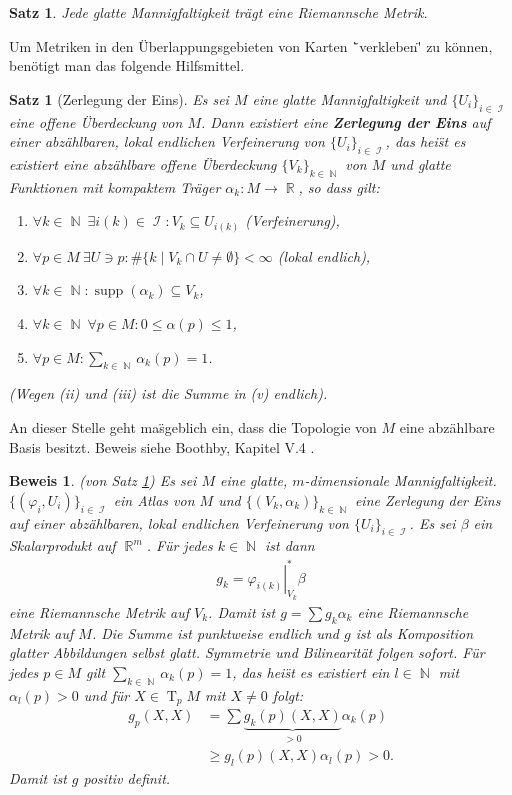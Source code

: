 \documentclass[paper=A4, twoside, chapterprefix=true, bibliography=totoc, headsepline]{scrbook}
\let\temp\phi{}
\let\phi\varphi{}
\let\varphi\temp{}
\let\temp\theta{}
\let\theta\vartheta{}
\let\vartheta\temp{}
\let\temp\epsilon{}
\let\epsilon\varepsilon{}
\let\varepsilon\temp{}
\let\temp\rho{}
\let\rho\varrho{}
\let\varrho\temp{}
\DeclareMathOperator{\N}{\mathbb{N}}
\DeclareMathOperator{\R}{\mathbb{R}}
\DeclareMathOperator{\calI}{\mathcal{I}}
\DeclareMathOperator{\supp}{supp}   %
\DeclareMathOperator{\T}{T}         %
\theoremstyle{plain}
\newtheorem{Satz}[Dfn]{Satz}
\theoremstyle{nonumberplain}
\newtheorem{satz}{Satz}
\newtheorem{bew}{Beweis}
\theoremstyle{empty}
\theoremstyle{break}
\newcommand{\CmIndex}[2][]{\ifthenelse{\isempty{#1}}{\index{#2}}{\index{#1}}#2}
\newcommand{\CmMark}[2][]{\textbf{\CmIndex[#1]{#2}}}
\begin{document}
\begin{Satz}\label{Satz-6-3}
  Jede glatte Mannigfaltigkeit tr\"agt eine Riemannsche Metrik.
\end{Satz}

Um Metriken in den \"Uberlappungsgebieten von Karten \"`verkleben\"' zu k\"onnen, ben\"otigt man das folgende Hilfsmittel.

\begin{satz}[Zerlegung der Eins]
  Es sei $M$ eine glatte Mannigfaltigkeit und $\{U_i\}_{i \in \calI}$ eine offene \"Uberdeckung von $M$.
  Dann existiert eine \CmMark{Zerlegung der Eins} auf einer abz\"ahlbaren, lokal endlichen Verfeinerung von $\{U_i\}_{i \in \calI}$, das hei\"st es existiert eine abz\"ahlbare offene \"Uberdeckung $\{V_k\}_{k\in\N}$ von $M$ und glatte Funktionen mit kompaktem Tr\"ager $\alpha_k \colon M \to \R$, so dass gilt:

  \begin{enumerate}[label=(\roman*)]
  \item $\forall k \in \N \ \exists i(k) \in \calI: V_k \subseteq U_{i(k)}$ (Verfeinerung),
  \item $\forall p \in M \ \exists U \ni p: \# \{k \mid V_k \cap U \neq \emptyset \} < \infty$ (lokal endlich),
  \item $\forall k \in \N: \supp (\alpha_k) \subseteq V_k$,
  \item $\forall k \in \N \ \forall p \in M: 0 \leq \alpha(p) \leq 1$,
  \item $\forall p \in M: \sum_{k\in\N}\alpha_k(p) = 1$.
  \end{enumerate}
  (Wegen (ii) und (iii) ist die Summe in (v) endlich).
\end{satz}
An dieser Stelle geht ma\"sgeblich ein, dass die Topologie von $M$ eine abz\"ahlbare Basis besitzt. Beweis siehe Boothby, Kapitel V.4 \cite{boothby1986introduction}.

\begin{bew}(von Satz \ref{Satz-6-3})
Es sei $M$ eine glatte, $m$-dimensionale Mannigfaltigkeit. $\{(\phi_i,U_i)\}_{i \in \calI}$ ein Atlas von $M$ und $\{(V_k,\alpha_k)\}_{k \in \N}$ eine Zerlegung der Eins auf einer abz\"ahlbaren, lokal endlichen Verfeinerung von $\{U_i\}_{i \in \calI}$. Es sei $\beta$ ein Skalarprodukt auf $\R^m$. F\"ur jedes $k \in \N$ ist dann
\begin{align*}
	g_k = \left.\phi_{i(k)}\right|_{V_k}^{*}\beta
\end{align*}
eine Riemannsche Metrik auf $V_k$. Damit ist $g = \sum g_k\alpha_k$ eine Riemannsche Metrik auf $M$.
Die Summe ist punktweise endlich und $g$ ist als Komposition glatter Abbildungen selbst glatt.
Symmetrie und Bilinearit\"at folgen sofort.
F\"ur jedes $p \in M$ gilt $\sum_{k \in \N}\alpha_k(p) = 1$, das hei\"st es existiert ein $l \in \N$ mit $\alpha_l(p) > 0$ und f\"ur $X \in \T_pM$ mit $X \neq 0$ folgt:
\begin{align*}
	g_p(X,X) & = \sum \underbrace{g_k(p)(X,X)}_{> 0}\alpha_k(p)\\
	& \geq g_l(p)(X,X)\alpha_l(p) > 0.
\end{align*}
Damit ist $g$ positiv definit.
\end{bew}
\end{document}
